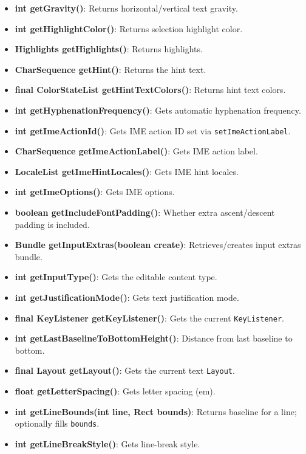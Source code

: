 \documentclass{report}
\begin{document}
\begin{itemize}
\begin{itemize}
                \item \textbf{int getGravity()}: Returns horizontal/vertical text gravity.
                \item \textbf{int getHighlightColor()}: Returns selection highlight color.
                \item \textbf{Highlights getHighlights()}: Returns highlights.
                \item \textbf{CharSequence getHint()}: Returns the hint text.
                \item \textbf{final ColorStateList getHintTextColors()}: Returns hint text colors.
                \item \textbf{int getHyphenationFrequency()}: Gets automatic hyphenation frequency.
                \item \textbf{int getImeActionId()}: Gets IME action ID set via \texttt{setImeActionLabel}.
                \item \textbf{CharSequence getImeActionLabel()}: Gets IME action label.
                \item \textbf{LocaleList getImeHintLocales()}: Gets IME hint locales.
                \item \textbf{int getImeOptions()}: Gets IME options.
                \item \textbf{boolean getIncludeFontPadding()}: Whether extra ascent/descent padding is included.
                \item \textbf{Bundle getInputExtras(boolean create)}: Retrieves/creates input extras bundle.
                \item \textbf{int getInputType()}: Gets the editable content type.
                \item \textbf{int getJustificationMode()}: Gets text justification mode.
                \item \textbf{final KeyListener getKeyListener()}: Gets the current \texttt{KeyListener}.
                \item \textbf{int getLastBaselineToBottomHeight()}: Distance from last baseline to bottom.
                \item \textbf{final Layout getLayout()}: Gets the current text \texttt{Layout}.
                \item \textbf{float getLetterSpacing()}: Gets letter spacing (em).
                \item \textbf{int getLineBounds(int line, Rect bounds)}: Returns baseline for a line; optionally fills \texttt{bounds}.
                \item \textbf{int getLineBreakStyle()}: Gets line-break style.

\end{itemize}
\end{itemize}
\end{document}
